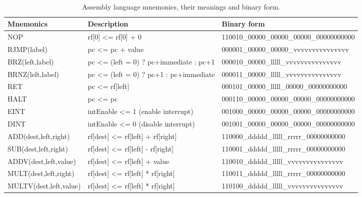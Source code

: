 \begin{table}[H]
  \begin{center}
    \caption{Assembly language mnemonics, their meanings and binary form.}
    \label{mnem}
    {\scriptsize
    {\tt
    \begin{tabular}{|l|l|l|}
      \hline
     Mnemonics & Description & Binary form \\ \hline \hline
      NOP                       & rf[0] <= rf[0] + 0                            & 110010\_00000\_00000\_00000\_00000000000  \\ \hline
      RJMP(label)               & pc <= pc + value                              & 000001\_00000\_00000\_vvvvvvvvvvvvvvv     \\ \hline
      BRZ(left,label)         & pc <= (left = 0) ? pc+immediate : pc+1          & 000010\_00000\_lllll\_vvvvvvvvvvvvvvv     \\ \hline
      BRNZ(left,label)        & pc <= (left = 0) ?  pc+1 : pc+immediate         & 000011\_00000\_lllll\_vvvvvvvvvvvvvvv     \\ \hline
      RET                       & pc <= rf[left]                                & 000101\_00000\_lllll\_00000\_00000000000  \\ \hline
      HALT                      & pc <= pc                                      & 000110\_00000\_00000\_00000\_00000000000  \\ \hline
      EINT                      & intEnable <= 1 (enable interrupt)             & 001000\_00000\_00000\_00000\_00000000000  \\ \hline
      DINT                      & intEnable <= 0 (disable interrupt)            & 001001\_00000\_00000\_00000\_00000000000  \\ \hline
      ADD(dest,left,right)    & rf[dest] <= rf[left] + rf[right]                & 110000\_ddddd\_lllll\_rrrrr\_00000000000  \\ \hline
      SUB(dest,left,right)    & rf[dest] <= rf[left] - rf[right]                & 110001\_ddddd\_lllll\_rrrrr\_00000000000  \\ \hline
      ADDV(dest,left,value)    & rf[dest] <= rf[left] + value                   & 110010\_ddddd\_lllll\_vvvvvvvvvvvvvvv     \\ \hline
      MULT(dest,left,right)   & rf[dest] <= rf[left] * rf[right]                & 110011\_ddddd\_lllll\_rrrrr\_00000000000  \\ \hline
      MULTV(dest,left,value)   & rf[dest] <= rf[left] * rf[right]               & 110100\_ddddd\_lllll\_vvvvvvvvvvvvvvv     \\ \hline

\end{tabular}}}
\end{center}
\end{table}
